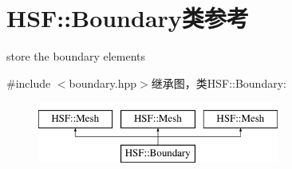 \hypertarget{classHSF_1_1Boundary}{
\section{HSF::Boundary类参考}
\label{classHSF_1_1Boundary}
}


store the boundary elements  


{\ttfamily \#include $<$boundary.hpp$>$}继承图，类HSF::Boundary:\begin{figure}[H]
\begin{center}
\leavevmode
\includegraphics[height=2cm]{classHSF_1_1Boundary}
\end{center}
\end{figure}
